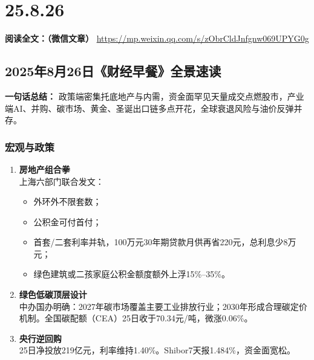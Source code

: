 \chapter{25.8.26}
\vspace{1cm}
\noindent\textbf{阅读全文：（微信文章）} \url{https://mp.weixin.qq.com/s/zObrCldJnfgnw069UPYG0g}

\section{2025年8月26日《财经早餐》全景速读}
\textbf{一句话总结：}  
政策端密集托底地产与内需，资金面罕见天量成交点燃股市，产业端AI、并购、碳市场、黄金、圣诞出口链多点开花，全球衰退风险与油价反弹并存。

\subsection{宏观与政策}
\begin{enumerate}[leftmargin=*, nosep]
    \item \textbf{房地产组合拳}  \\
    上海六部门联合发文：  
    \begin{itemize}[nosep]
        \item 外环外不限套数；  
        \item 公积金可付首付；  
        \item 首套/二套利率并轨，100万元30年期贷款月供再省220元，总利息少8万元；  
        \item 绿色建筑或二孩家庭公积金额度额外上浮15\%–35\%。
    \end{itemize}
    
    \item \textbf{绿色低碳顶层设计}  \\
    中办国办明确：2027年碳市场覆盖主要工业排放行业；2030年形成合理碳定价机制。全国碳配额（CEA）25日收于70.34元/吨，微涨0.06\%。
    
    \item \textbf{央行逆回购}  \\
    25日净投放219亿元，利率维持1.40\%。Shibor7天报1.484\%，资金面宽松。
\end{enumerate}

